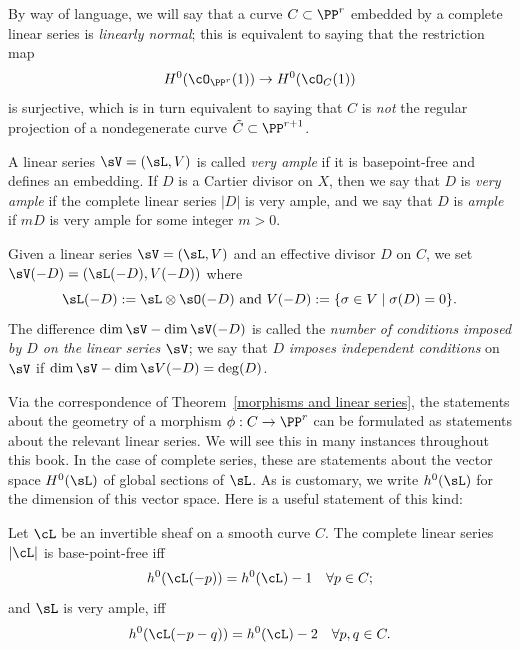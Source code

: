 By way of language, we will say that a curve $C \subset \PP^r$ embedded by a complete linear series is \emph{linearly normal}; this is equivalent to saying that the restriction map
$$
H^0(\cO_{\PP^r}(1)) \to H^0(\cO_{C}(1))
$$
is surjective, which is in turn equivalent to saying that $C$ is \emph{not} the regular  projection of a nondegenerate curve $\tilde C \subset \PP^{r+1}$.

A linear series $\sV = (\sL, V)$ is called  \emph{very ample}  if it is basepoint-free and defines an embedding. If $D$ is a Cartier divisor on $X$, then we say that $D$ is \emph{very ample} if the complete linear series $|D|$ is very ample, and we say that $D$ is \emph{ample} if $mD$ is very ample for some integer $m>0$.


Given a linear series $\sV = (\sL, V)$ and an effective divisor $D$ on $C$, we  set
$
\sV(-D) = (\sL(-D),V(-D))
$
where
$$
\sL(-D): = \sL \otimes \sO(-D)\hbox{ and } V(-D) := \{ \sigma \in V \mid \sigma(D) = 0 \}.
$$
The difference $\dim \sV - \dim \sV(-D)$ is called the \emph{number of conditions imposed by $D$ on the linear series $\sV$}; we say that $D$ \emph{imposes independent conditions} on $\sV$ if $\dim \sV - \dim \s V(-D) = \deg(D)$.

Via the correspondence of Theorem~\ref{morphisms and linear series}, the statements about the geometry of a morphism $\phi : C \to \PP^r$ can be formulated as statements about the relevant linear series. We will see this in many instances throughout this book. In the case of complete series, these are statements about the vector space $H^{0}(\sL)$ of global sections of $\sL$. As is customary, we write $h^{0}(\sL)$ for the dimension of this vector space. Here is a useful statement of this kind:

\begin{proposition}\label{very ample}\cite[Thm. IV.3.1]{H}
Let $\cL$ be an invertible sheaf on a smooth curve $C$. The complete linear series $|\cL|$ is base-point-free iff
$$
h^0(\cL(-p)) = h^0(\cL) - 1 \quad \forall p \in C;
$$
and $\sL$ is very ample, iff
$$
h^0(\cL(-p-q)) = h^0(\cL) - 2 \quad \forall p, q \in C.
$$
\end{proposition} 

